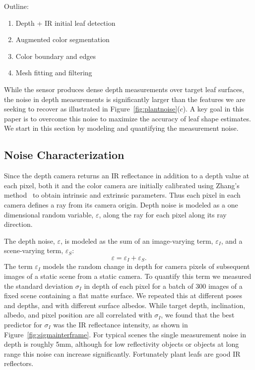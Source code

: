 Outline:
\begin{enumerate}
\item Depth + IR initial leaf detection
\item Augmented color segmentation
\item Color boundary and edges
\item Mesh fitting and filtering
\end{enumerate}




\label{sec:data}


While the sensor produces dense depth measurements over target leaf surfaces, the noise in depth measurements is significantly larger than the features we are seeking to recover as illustrated in Figure~\ref{fig:plantnoise}($c$).  A key goal in this paper is to overcome this noise to maximize the accuracy of leaf shape estimates.  We start in this section by modeling and quantifying the measurement noise.



\subsection{Noise Characterization}
\label{sec:noise}

Since the depth camera returns an IR reflectance in addition to a depth value at each pixel, both it and the color camera are initially calibrated using Zhang's method~\cite{Zhang2000} to obtain intrinsic and extrinsic parameters.  Thus each pixel in each camera defines a ray from its camera origin.  Depth noise is modeled as a one dimensional random variable, $\varepsilon$, along the ray for each pixel along its ray direction.

The depth noise, $\varepsilon$, is modeled as the sum of an image-varying term, $\varepsilon_I$, and a scene-varying term, $\varepsilon_S$:
\begin{equation}
\varepsilon = \varepsilon_I + \varepsilon_S. \label{eq:epsilon}
\end{equation}
The term $\varepsilon_I$ models the random change in depth for camera pixels of subsequent images of a static scene from a static camera.  To quantify this term we measured the standard deviation $\sigma_I$ in depth of each pixel for a batch of 300 images of a fixed scene containing a flat matte surface.  We repeated this at different poses and depths, and with different surface albedos.  While target depth, inclination, albedo, and pixel position are all correlated with $\sigma_I$, we found that the best predictor for $\sigma_I$ was the IR reflectance intensity, as shown in Figure~\ref{fig:sigmainterframe}.  For typical scenes the single measurement noise in depth is roughly 5mm, although for low reflectivity objects or objects at long range this noise can increase significantly.  Fortunately plant leafs are good IR reflectors.


